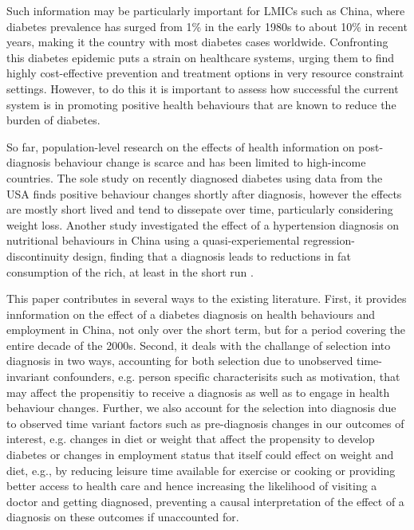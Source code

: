 Such information may be particularly important for \acp{LMIC} such as China, where diabetes prevalence has surged from 1\% in the early 1980s to about 10\% in recent years, making it the country with most diabetes cases worldwide.\autocite{Hu2011,Risk2016} Confronting this diabetes epidemic puts a strain on healthcare systems, urging them to find highly cost-effective prevention and treatment options in very resource constraint settings. However, to do this it is important to assess how successful the current system is in promoting positive health behaviours that are known to reduce the burden of diabetes.

So far, population-level research on the effects of health information on post-diagnosis behaviour change is scarce and has been limited to high-income countries. The sole study on recently diagnosed diabetes using data from the USA finds positive behaviour changes shortly after diagnosis, however the effects are mostly short lived and tend to dissepate over time, particularly considering weight loss.\autocite{Slade2012} Another study investigated the effect of a hypertension diagnosis on nutritional behaviours in China using a quasi-experiemental regression-discontinuity design, finding that a diagnosis leads to reductions in fat consumption of the rich, at least in the short run \autocite{Zhao2013a}. 

This paper contributes in several ways to the existing literature. First, it provides innformation on the effect of a diabetes diagnosis on health behaviours and employment in China, not only over the short term, but for a period covering the entire decade of the 2000s. Second, it deals with the challange of selection into diagnosis in two ways, accounting for both selection due to unobserved time-invariant confounders, e.g. person specific characterisits such as motivation, that may affect the propensitiy to receive a diagnosis as well as to engage in health behaviour changes. Further, we also account for the selection into diagnosis due to observed time variant factors such as pre-diagnosis changes in our outcomes of interest, e.g. changes in diet or weight that affect the propensity to develop diabetes or changes in employment status that itself could effect on weight and diet, e.g., by reducing leisure time available for exercise or cooking or providing better access to health care and hence increasing the likelihood of visiting a doctor and getting diagnosed, preventing a causal interpretation of the effect of a diagnosis on these outcomes if unaccounted for.  


